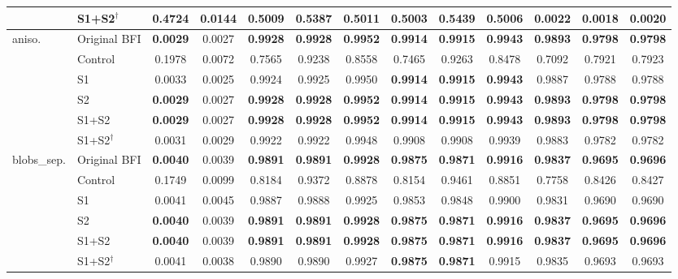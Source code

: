 \begin{table}[!t]
\begin{tabular}{llccccccccccc}
 & S1+S2$^{\dagger}$ & 0.4724 & 0.0144 & 0.5009 & 0.5387 & 0.5011 & 0.5003 & 0.5439 & 0.5006 & 0.0022 & 0.0018 & 0.0020 \\
\midrule
\multirow{6}{*}{aniso.} & Original BFI & \textbf{0.0029} & 0.0027 & \textbf{0.9928} & \textbf{0.9928} & \textbf{0.9952} & \textbf{0.9914} & \textbf{0.9915} & \textbf{0.9943} & \textbf{0.9893} & \textbf{0.9798} & \textbf{0.9798} \\
 & Control & 0.1978 & 0.0072 & 0.7565 & 0.9238 & 0.8558 & 0.7465 & 0.9263 & 0.8478 & 0.7092 & 0.7921 & 0.7923 \\
 & S1 & 0.0033 & 0.0025 & 0.9924 & 0.9925 & 0.9950 & \textbf{0.9914} & \textbf{0.9915} & \textbf{0.9943} & 0.9887 & 0.9788 & 0.9788 \\
 & S2 & \textbf{0.0029} & 0.0027 & \textbf{0.9928} & \textbf{0.9928} & \textbf{0.9952} & \textbf{0.9914} & \textbf{0.9915} & \textbf{0.9943} & \textbf{0.9893} & \textbf{0.9798} & \textbf{0.9798} \\
 & S1+S2 & \textbf{0.0029} & 0.0027 & \textbf{0.9928} & \textbf{0.9928} & \textbf{0.9952} & \textbf{0.9914} & \textbf{0.9915} & \textbf{0.9943} & \textbf{0.9893} & \textbf{0.9798} & \textbf{0.9798} \\
 & S1+S2$^{\dagger}$ & 0.0031 & 0.0029 & 0.9922 & 0.9922 & 0.9948 & 0.9908 & 0.9908 & 0.9939 & 0.9883 & 0.9782 & 0.9782 \\
\midrule
\multirow{6}{*}{blobs\_sep.} & Original BFI & \textbf{0.0040} & 0.0039 & \textbf{0.9891} & \textbf{0.9891} & \textbf{0.9928} & \textbf{0.9875} & \textbf{0.9871} & \textbf{0.9916} & \textbf{0.9837} & \textbf{0.9695} & \textbf{0.9696} \\
 & Control & 0.1749 & 0.0099 & 0.8184 & 0.9372 & 0.8878 & 0.8154 & 0.9461 & 0.8851 & 0.7758 & 0.8426 & 0.8427 \\
 & S1 & 0.0041 & 0.0045 & 0.9887 & 0.9888 & 0.9925 & 0.9853 & 0.9848 & 0.9900 & 0.9831 & 0.9690 & 0.9690 \\
 & S2 & \textbf{0.0040} & 0.0039 & \textbf{0.9891} & \textbf{0.9891} & \textbf{0.9928} & \textbf{0.9875} & \textbf{0.9871} & \textbf{0.9916} & \textbf{0.9837} & \textbf{0.9695} & \textbf{0.9696} \\
 & S1+S2 & \textbf{0.0040} & 0.0039 & \textbf{0.9891} & \textbf{0.9891} & \textbf{0.9928} & \textbf{0.9875} & \textbf{0.9871} & \textbf{0.9916} & \textbf{0.9837} & \textbf{0.9695} & \textbf{0.9696} \\
 & S1+S2$^{\dagger}$ & 0.0041 & 0.0038 & 0.9890 & 0.9890 & 0.9927 & \textbf{0.9875} & \textbf{0.9871} & 0.9915 & 0.9835 & 0.9693 & 0.9693 \\

\end{tabular}
\end{table}
